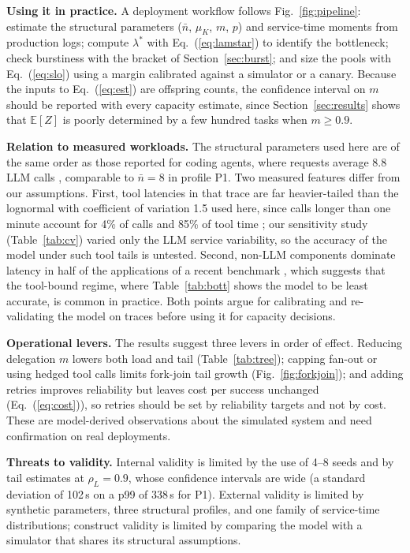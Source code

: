 \documentclass[journal]{IEEEtran}
\newcommand{\E}{\mathbb{E}}
\begin{document}
\textbf{Using it in practice.} A deployment workflow follows Fig.~\ref{fig:pipeline}: estimate the structural parameters ($\bar n$, $\mu_K$, $m$, $p$) and service-time moments from production logs; compute $\lambda^\ast$ with Eq.~(\ref{eq:lamstar}) to identify the bottleneck; check burstiness with the bracket of Section~\ref{sec:burst}; and size the pools with Eq.~(\ref{eq:slo}) using a margin calibrated against a simulator or a canary. Because the inputs to Eq.~(\ref{eq:est}) are offspring counts, the confidence interval on $m$ should be reported with every capacity estimate, since Section~\ref{sec:results} shows that $\E[Z]$ is poorly determined by a few hundred tasks when $m\ge0.9$.

\textbf{Relation to measured workloads.} The structural parameters used here are of the same order as those reported for coding agents, where requests average 8.8 LLM calls \cite{zhu2026tracelab}, comparable to $\bar n=8$ in profile P1. Two measured features differ from our assumptions. First, tool latencies in that trace are far heavier-tailed than the lognormal with coefficient of variation 1.5 used here, since calls longer than one minute account for 4\% of calls and 85\% of tool time \cite{zhu2026tracelab}; our sensitivity study (Table~\ref{tab:cv}) varied only the LLM service variability, so the accuracy of the model under such tool tails is untested. Second, non-LLM components dominate latency in half of the applications of a recent benchmark \cite{chang2026agentic}, which suggests that the tool-bound regime, where Table~\ref{tab:bott} shows the model to be least accurate, is common in practice. Both points argue for calibrating and re-validating the model on traces before using it for capacity decisions.

\textbf{Operational levers.} The results suggest three levers in order of effect. Reducing delegation $m$ lowers both load and tail (Table~\ref{tab:tree}); capping fan-out or using hedged tool calls limits fork-join tail growth (Fig.~\ref{fig:forkjoin}); and adding retries improves reliability but leaves cost per success unchanged (Eq.~(\ref{eq:cost})), so retries should be set by reliability targets and not by cost. These are model-derived observations about the simulated system and need confirmation on real deployments.

\textbf{Threats to validity.} Internal validity is limited by the use of 4--8 seeds and by tail estimates at $\rho_L=0.9$, whose confidence intervals are wide (a standard deviation of 102\,s on a p99 of 338\,s for P1). External validity is limited by synthetic parameters, three structural profiles, and one family of service-time distributions; construct validity is limited by comparing the model with a simulator that shares its structural assumptions.
\end{document}
